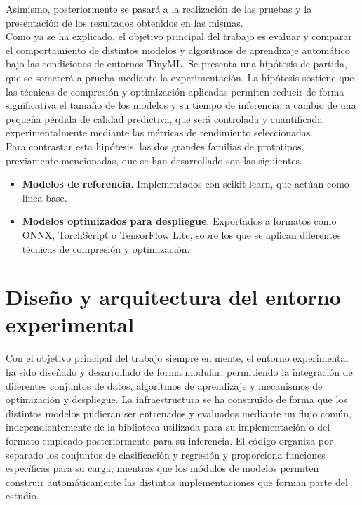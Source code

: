 \documentclass[a4paper,12pt,twoside,final]{book}
\begin{document}
Asimismo, posteriormente se pasará a la realización de las pruebas y la presentación de los resultados obtenidos en
las mismas.\\

Como ya se ha explicado, el objetivo principal del trabajo es evaluar y comparar el comportamiento de distintos
modelos y algoritmos de aprendizaje automático bajo las condiciones de entornos TinyML. Se presenta una hipótesis de
partida, que se someterá a prueba mediante la experimentación. La hipótesis sostiene que las técnicas de compresión
y optimización aplicadas permiten reducir de forma significativa el tamaño de los modelos y su tiempo de inferencia,
a cambio de una pequeña pérdida de calidad predictiva, que será controlada y cuantificada experimentalmente mediante
las métricas de rendimiento seleccionadas.\\

Para contrastar esta hipótesis, las dos grandes familias de prototipos, previamente mencionadas, que se han
desarrollado son las siguientes.
\begin{itemize}
  \item \textbf{Modelos de referencia}. Implementados con scikit-learn, que actúan como línea base.
  \item \textbf{Modelos optimizados para despliegue}. Exportados a formatos como ONNX, TorchScript o TensorFlow Lite,
  sobre los que se aplican diferentes técnicas de compresión y optimización.
\end{itemize}

\section{Diseño y arquitectura del entorno experimental}
Con el objetivo principal del trabajo siempre en mente, el entorno experimental ha sido diseñado y desarrollado de
forma modular, permitiendo la integración de diferentes conjuntos de datos, algoritmos de aprendizaje y mecanismos
de optimización y despliegue. La infraestructura se ha construido de forma que los distintos modelos pudieran ser
entrenados y evaluados mediante un flujo común, independientemente de la biblioteca utilizada para su implementación
o del formato empleado posteriormente para su inferencia. El código organiza por separado los conjuntos de
clasificación y regresión y proporciona funciones específicas para su carga, mientras que los módulos de modelos
permiten construir automáticamente las distintas implementaciones que forman parte del estudio.\\
\end{document}
